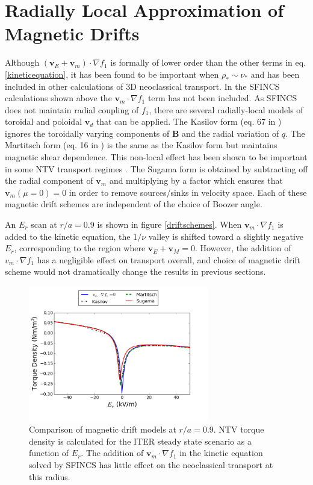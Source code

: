 \documentclass{article}
\begin{document}
\FloatBarrier

\section{Radially Local Approximation of Magnetic Drifts}\label{mds}
Although $(\bm{v}_E + \bm{v}_m) \cdot \nabla f_1$ is formally of lower order than the other terms in eq. \ref{kineticequation}, it has been found to be important when $\rho_* \sim \nu_*$ and has been included in other calculations of 3D neoclassical transport. In the SFINCS calculations shown above the $\bm{v}_m \cdot \nabla f_1$ term has not been included. As SFINCS does not maintain radial coupling of $f_1$, there are several radially-local models of toroidal and poloidal $\bm{v}_d$ that can be applied.  The Kasilov form (eq. 67 in \cite{Kasilov2014}) ignores the toroidally varying components of $\bm{B}$ and the radial variation of $q$. The Martitsch form (eq. 16 in \cite{Martitsch2016}) is the same as the Kasilov form but maintains magnetic shear dependence. This non-local effect has been shown to be important in some NTV transport regimes \cite{Martitsch2016}. The Sugama form is obtained by subtracting off the radial component of $\bm{v}_m$ and multiplying by a factor which ensures that $\bm{v}_m (\mu = 0)  = 0$ in order to remove sources/sinks in velocity space. Each of these magnetic drift schemes are independent of the choice of Boozer angle. 

An $E_r$ scan at $r/a = 0.9$ is shown in figure \ref{driftschemes}. When $\bm{v}_m \cdot \nabla f_1$ is added to the kinetic equation, the $1/\nu$ valley is shifted toward a slightly negative $E_r$, corresponding to the region where $\bm{v}_E + \bm{v}_M = 0$. However, the addition of $v_m \cdot \nabla f_1$ has a negligible effect on transport overall, and choice of magnetic drift scheme would not dramatically change the results in previous sections.  

\begin{figure}[h!]
\centering
\includegraphics[width=0.7\textwidth]{mdscomparison.png}
\caption{Comparison of magnetic drift models at $r/a = 0.9$. NTV torque density is calculated for the ITER steady state scenario as a function of $E_r$. The addition of $\bm{v}_m \cdot \nabla f_1$ in the kinetic equation solved by SFINCS has little effect on the neoclassical transport at this radius. }
\end{figure}\label{driftschemes}
\end{document}
